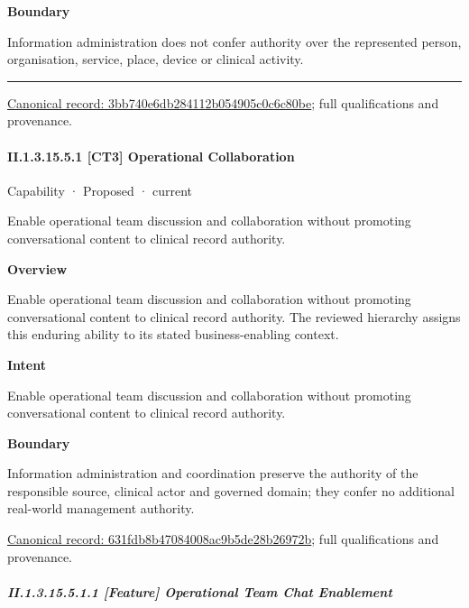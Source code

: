 \textbf{Boundary}



Information administration does not confer authority over the represented person, organisation, service, place, device or clinical activity.



\medskip\hrule\medskip

{\footnotesize \href{../../../../continuum/strategy/capability/3bb740e6db284112b054905c0c6c80be.md}{Canonical record: 3bb740e6db284112b054905c0c6c80be}; full qualifications and provenance.}\par
\paragraph*{II.1.3.15.5.1 [CT3] Operational Collaboration}
\label{navigation:II.1.3.15.5.1}

\label{element:631fdb8b47084008ac9b5de28b26972b}
{\small Capability · Proposed · current}\par

Enable operational team discussion and collaboration without promoting conversational content to clinical record authority.



\textbf{Overview}



Enable operational team discussion and collaboration without promoting conversational content to clinical record authority. The reviewed hierarchy assigns this enduring ability to its stated business-enabling context.



\textbf{Intent}



Enable operational team discussion and collaboration without promoting conversational content to clinical record authority.



\textbf{Boundary}



Information administration and coordination preserve the authority of the responsible source, clinical actor and governed domain; they confer no additional real-world management authority.


{\footnotesize \href{../../../../continuum/strategy/capability/631fdb8b47084008ac9b5de28b26972b.md}{Canonical record: 631fdb8b47084008ac9b5de28b26972b}; full qualifications and provenance.}\par
\subparagraph*{II.1.3.15.5.1.1 [Feature] Operational Team Chat Enablement}
\label{navigation:II.1.3.15.5.1.1}

